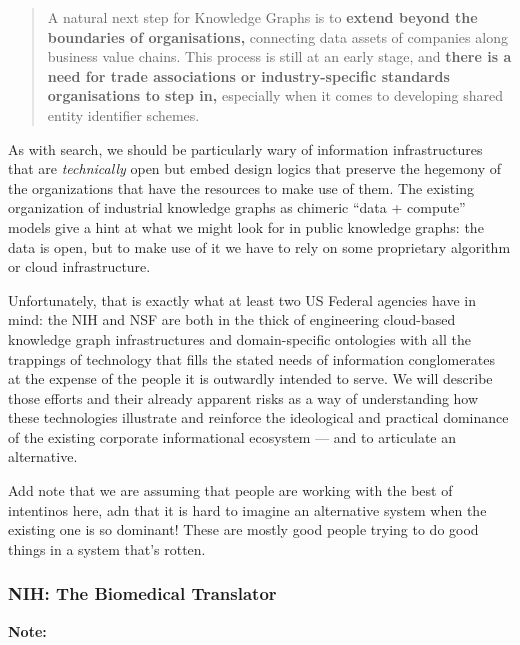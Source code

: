 \begin{quote}
A natural next step for Knowledge Graphs is to \textbf{extend beyond the
boundaries of organisations,} connecting data assets of companies along
business value chains. This process is still at an early stage, and
\textbf{there is a need for trade associations or industry-specific
standards organisations to step in,} especially when it comes to
developing shared entity identifier schemes. \cite{panExploitingLinkedData2017} 
\end{quote}

As with search, we should be particularly wary of information
infrastructures that are \emph{technically} open but embed
design logics that preserve the hegemony of the organizations that have
the resources to make use of them. The existing organization of
industrial knowledge graphs as chimeric ``data + compute'' models give a
hint at what we might look for in public knowledge graphs: the data is
open, but to make use of it we have to rely on some proprietary
algorithm or cloud infrastructure.

Unfortunately, that is exactly what at least two US Federal agencies
have in mind: the NIH and NSF are both in the thick of engineering
cloud-based knowledge graph infrastructures and domain-specific
ontologies with all the trappings of technology that fills the stated
needs of information conglomerates at the expense of the people it is
outwardly intended to serve. We will describe those efforts and their
already apparent risks as a way of understanding how these technologies
illustrate and reinforce the ideological and practical dominance of the
existing corporate informational ecosystem --- and to articulate an
alternative.

Add note that we are assuming that people are working with the best of
intentinos here, adn that it is hard to imagine an alternative system
when the existing one is so dominant! These are mostly good people
trying to do good things in a system that's rotten.

\hypertarget{nih-the-biomedical-translator}{%
\subsubsection{NIH: The Biomedical
Translator}\label{nih-the-biomedical-translator}}

\textbf{Note:}

